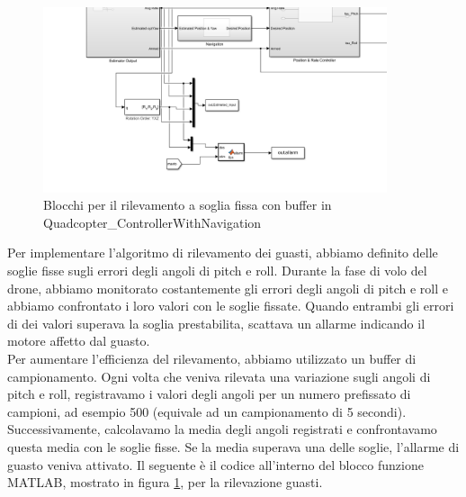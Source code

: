 \begin{figure}[H]  %
    \centering
    \includegraphics[width=0.9\textwidth]{files/images/soglia_fissa_buffer.png}
    \caption{Blocchi per il rilevamento a soglia fissa con buffer in Quadcopter\_ControllerWithNavigation}
    \label{fig:Blocchi per il rilevamento a soglia fissa con buffer}
\end{figure}
\noindent
Per implementare l'algoritmo di rilevamento dei guasti, abbiamo definito delle soglie fisse sugli errori degli angoli di pitch e roll. Durante la fase di volo del drone, abbiamo monitorato costantemente gli errori degli angoli di pitch e roll e abbiamo confrontato i loro valori con le soglie fissate. Quando entrambi gli errori di  dei valori superava la soglia prestabilita, scattava un allarme indicando il motore affetto dal guasto.
\\
Per aumentare l'efficienza del rilevamento, abbiamo utilizzato un buffer di campionamento. Ogni volta che veniva rilevata una variazione sugli angoli di pitch e roll, registravamo i valori degli angoli per un numero prefissato di campioni, ad esempio 500 (equivale ad un campionamento di 5 secondi). Successivamente, calcolavamo la media degli angoli registrati e confrontavamo questa media con le soglie fisse. Se la media superava una delle soglie, l'allarme di guasto veniva attivato. Il seguente è il codice all'interno del blocco funzione MATLAB, mostrato in figura \ref{fig:Blocchi per il rilevamento a soglia fissa con buffer}, per la rilevazione guasti.
